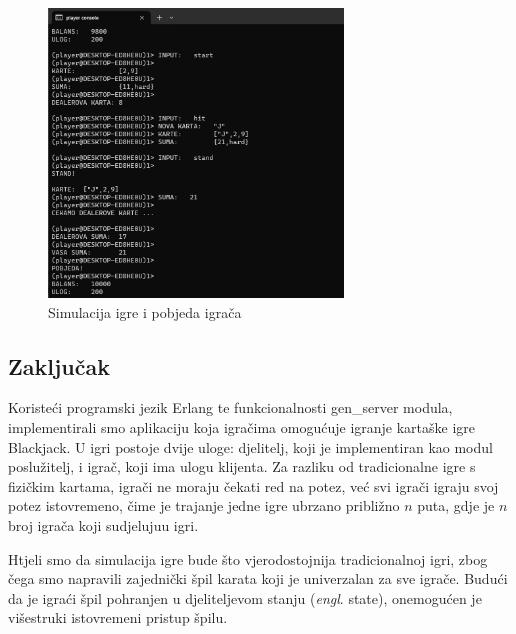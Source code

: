 \documentclass[conference]{IEEEtran}
\begin{document}
\begin{figure}[H]
\centerline{\includegraphics[width=18.5pc]{4.jpeg}}
\caption{Simulacija igre i pobjeda igrača}
\vspace*{-5pt}
\end{figure}


\subsection{Zaključak}

Koristeći programski jezik Erlang te funkcionalnosti gen\_server modula, implementirali smo aplikaciju koja igračima omogućuje igranje kartaške igre Blackjack. U igri postoje dvije uloge: djelitelj, koji je implementiran kao modul poslužitelj, i igrač, koji ima ulogu klijenta.  Za razliku od tradicionalne igre s fizičkim kartama, igrači ne moraju čekati red na potez, već svi igrači igraju svoj potez istovremeno, čime je trajanje jedne igre ubrzano približno $n$ puta, gdje je $n$ broj igrača koji sudjeluju\break u igri.

Htjeli smo da simulacija igre bude što vjerodostojnija tradicionalnoj igri, zbog čega smo napravili zajednički špil karata koji je univerzalan za sve igrače. Budući da je igraći špil pohranjen u djeliteljevom stanju (\textit{engl}. state), onemogućen je višestruki istovremeni pristup špilu. 
\end{document}

